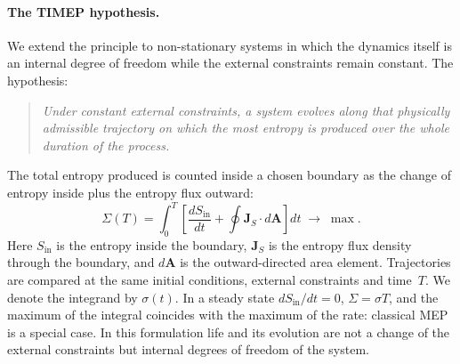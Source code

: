 \documentclass[11pt,a4paper]{article}
\begin{document}
\paragraph{The TIMEP hypothesis.}
We extend the principle to non-stationary systems in which the dynamics itself is an internal degree of freedom while the external constraints remain constant. The hypothesis:

\begin{quote}
\emph{Under constant external constraints, a system evolves along that physically admissible trajectory on which the most entropy is produced over the whole duration of the process.}
\end{quote}

The total entropy produced is counted inside a chosen boundary as the change of entropy inside plus the entropy flux outward:
\begin{equation}\label{eq:timep}
\Sigma(T)=\int_0^T\left[\frac{dS_{\mathrm{in}}}{dt}+\oint \mathbf{J}_S\cdot d\mathbf{A}\right]dt\;\to\;\max .
\end{equation}
Here $S_{\mathrm{in}}$ is the entropy inside the boundary, $\mathbf{J}_S$ is the entropy flux density through the boundary, and $d\mathbf{A}$ is the outward-directed area element. Trajectories are compared at the same initial conditions, external constraints and time~$T$. We denote the integrand by $\sigma(t)$. In a steady state $dS_{\mathrm{in}}/dt=0$, $\Sigma=\sigma T$, and the maximum of the integral coincides with the maximum of the rate: classical MEP is a special case. In this formulation life and its evolution are not a change of the external constraints but internal degrees of freedom of the system.
\end{document}
